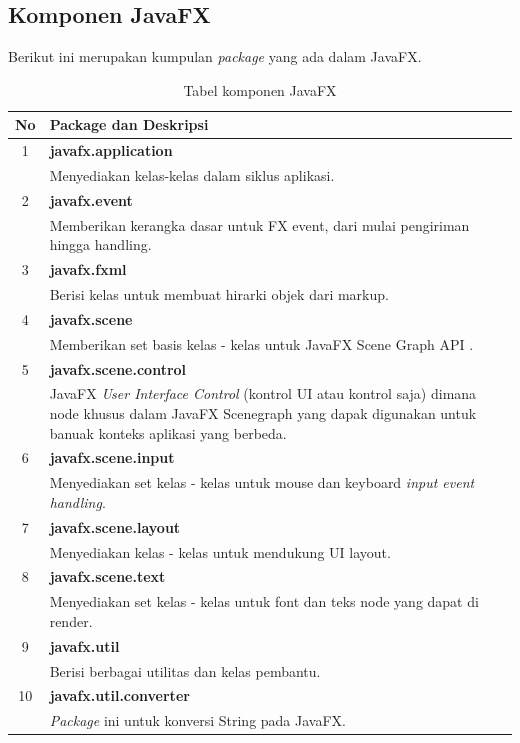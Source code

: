 \subsection{Komponen JavaFX}
\label{subs:Komponen_Java_FX}
Berikut ini merupakan kumpulan \textit{package} yang ada dalam JavaFX.\cite{javafx3}
\begin{table}[H]
		\centering
		\caption{Tabel komponen JavaFX}
		\label{tab:komponen_javafx}
	\begin{tabular}{|c|p{12cm}|}
		\hline
		\textbf{No} & \textbf{Package dan Deskripsi} \\ \hline \hline
		1 & \textbf{javafx.application}\\
			&	Menyediakan kelas-kelas dalam siklus aplikasi.\\ \hline
		2 & \textbf{javafx.event}\\
			&	Memberikan kerangka dasar untuk FX event, dari mulai pengiriman hingga handling.\\ \hline	
		3 & \textbf{javafx.fxml}\\
			&	Berisi kelas untuk membuat hirarki objek dari markup.\\ \hline
		4 & \textbf{javafx.scene}\\
			&	Memberikan set basis kelas - kelas untuk JavaFX Scene Graph API .\\ \hline
		5 & \textbf{javafx.scene.control}\\
			&	JavaFX \textit{User Interface Control }(kontrol UI atau kontrol saja) dimana node khusus dalam JavaFX Scenegraph yang dapak digunakan untuk banuak konteks aplikasi yang berbeda.\\ \hline
		6 & \textbf{javafx.scene.input}\\
			&	Menyediakan set kelas - kelas untuk mouse dan keyboard \textit{input event handling}.\\ \hline
		7 & \textbf{javafx.scene.layout}\\
			&	Menyediakan kelas - kelas untuk mendukung UI layout.\\ \hline
		8 & \textbf{javafx.scene.text}\\
			&	Menyediakan set kelas - kelas untuk font dan teks node yang dapat di render.\\ \hline
		9 & \textbf{javafx.util}\\
			&	Berisi berbagai utilitas dan kelas pembantu.\\ \hline
		10 & \textbf{javafx.util.converter}\\
			&	\textit{Package} ini untuk konversi String pada JavaFX.\\ \hline

\end{tabular}
\end{table}
